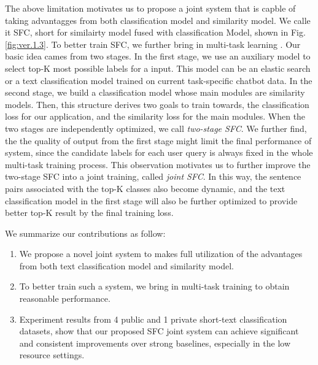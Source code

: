 \documentclass[letterpaper]{article} %
\begin{document}
  The  above limitation motivates us to propose a joint system that is capble of
  taking  advantagges  from  both  classification model and similarity model. We
  calle  it  SFC,  short  for  similairty model fused with classification Model,
  shown  in  Fig.  \ref{fig:ver.1.3}.  To  better train SFC, we further bring in
  multi-task   learning   \cite{caruana1993multitask,collobert2008unified}.  Our
  basic  idea  cames  from  two  stages. In the first stage, we use an auxiliary
  model  to  select top-K most possible labels for a input. This model can be an
  elastic search  \cite{divya2013elasticsearch}  or  a  text classification model
  trained on current task-specific chatbot data. In the second stage, we build a
  classification  model  whose  main modules are similarity models. Then, this
  structure  derives two goals to train towards, the classification loss for our
  application,  and the similarity loss for the main modules. When the two stages
  are  independently  optimized,  we call \emph{two-stage SFC}. We further find,
  the  the  quality  of  output  from  the  first  stage  might  limit the final
  performance  of  system,  since  the  candidate  labels for each user query is
  always  fixed  in  the  whole  multi-task  training  process. This observation
  motivates  us  to  further  improve  the  two-stage SFC into a joint training,
  called  \emph{joint  SFC}. In this way, the sentence pairs associated with the
  top-K  classes  also  become dynamic, and the text classification model in the
  first  stage  will also be further optimized to provide better top-K result by
  the final training loss.


  We summarize our contributions as follow:
  \begin{enumerate}
    \item We propose a novel joint system to makes full utilization of
    the advantages from both text classification model and similarity model.

    \item To  better  train such a system, we bring in multi-task training to obtain
    reasonable performance.

    \item Experiment  results  from 4 public and 1 private short-text classification
    datasets,  show  that  our  proposed  SFC joint system can achieve significant
    and consistent improvements over strong baselines, especially in the low resource settings.
  \end{enumerate}
\end{document}
